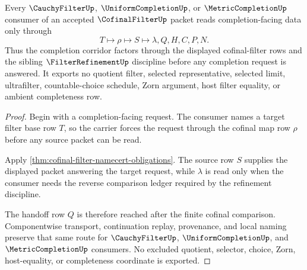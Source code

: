 \begin{theorem}
\label{thm:cofinal-filter-completion-handoff}
Every $\CauchyFilterUp$, $\UniformCompletionUp$, or $\MetricCompletionUp$ consumer of an accepted $\CofinalFilterUp$ packet reads completion-facing data only through
$$
T \longmapsto \rho \longmapsto S \longmapsto \lambda,Q,H,C,P,N .
$$
Thus the completion corridor factors through the displayed cofinal-filter rows and the sibling $\FilterRefinementUp$ discipline before any completion request is answered. It exports no quotient filter, selected representative, selected limit, ultrafilter, countable-choice schedule, Zorn argument, host filter equality, or ambient completeness row.
\end{theorem}
\begin{proof}
Begin with a completion-facing request. The consumer names a target filter base row $T$, so the carrier forces the request through the cofinal map row $\rho$ before any source packet can be read.

Apply \autoref{thm:cofinal-filter-namecert-obligations}. The source row $S$ supplies the displayed packet answering the target request, while $\lambda$ is read only when the consumer needs the reverse comparison ledger required by the refinement discipline.

The handoff row $Q$ is therefore reached after the finite cofinal comparison. Componentwise transport, continuation replay, provenance, and local naming preserve that same route for $\CauchyFilterUp$, $\UniformCompletionUp$, and $\MetricCompletionUp$ consumers. No excluded quotient, selector, choice, Zorn, host-equality, or completeness coordinate is exported.
\end{proof}




